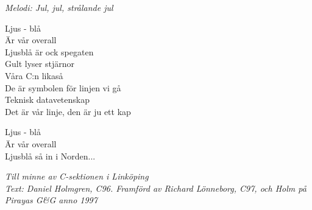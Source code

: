 {\footnotesize\textit{Melodi: Jul, jul, strålande jul}}\par
\vspace{10pt}
Ljus - blå\\
Är vår overall\\
Ljusblå är ock spegaten\\
Gult lyser stjärnor\\
Våra C:n likaså\\
De är symbolen för linjen vi gå\\
Teknisk datavetenskap\\
Det är vår linje, den är ju ett kap\par
\vspace{10pt}
Ljus - blå\\
Är vår overall\\
Ljusblå så in i Norden...
\par
\vspace{10pt}
{\footnotesize\textit{Till minne av C-sektionen i Linköping\\ Text: Daniel Holmgren, C96. Framförd av Richard Lönneborg, C97, och Holm på Pirayas G\&G anno 1997}}
